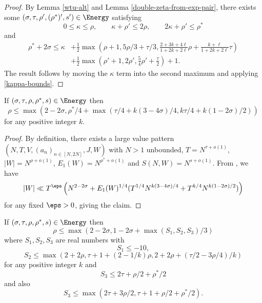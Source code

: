
\begin{proof}
By Lemma \ref{wtu-alt} and Lemma \ref{double-zeta-from-exp-pair}, there exists some $(\sigma, \tau, \rho', (\rho^*)', s') \in \Energy$ satisfying
\begin{equation}\label{kappa-bounds}
0 \le \kappa \le \rho,\qquad \kappa + \rho' \le 2\rho,\qquad 2\kappa + \rho' \le \rho^*
\end{equation}
and
\begin{align*}
\rho^* + 2\sigma \le \kappa &+ \frac{1}{2}\max\left( \rho+1, 5\rho/3 + \tau/3, \frac{2+3k+4\ell}{1+2k+2\ell} \rho + \frac{k+\ell}{1+2k+2\ell} \tau\right)\\
&+ \frac{1}{2}\max\left(\rho' + 1, 2\rho', \frac{5}{4}\rho' + \frac{\tau}{2}\right) + 1.
\end{align*}
The result follows by moving the $\kappa$ term into the second maximum and applying \eqref{kappa-bounds}.
\end{proof}


\begin{lemma}\label{hbt-2} If $(\sigma,\tau,\rho,\rho^*,s) \in \Energy$ then
$$ \rho \leq \max( 2-2\sigma, \rho^*/4 + \max(\tau/4 + k(3-4\sigma)/4, k\tau/4 + k(1-2\sigma)/2))$$
for any positive integer $k$.
\end{lemma}

\literature
{}

\begin{proof} By definition, there exists a large value pattern $(N,T,V,(a_n)_{n \in [N,2N]},J,W)$ with $N>1$ unbounded, $T = N^{\tau+o(1)}$, $|W| = N^{\rho+o(1)}$, $E_1(W) = N^{\rho^*+o(1)}$ and $S(N,W) = N^{s+o(1)}$.   From \cite[Lemma 4]{heathbrown_zero_1979}, we have
$$ |W| \ll T^\eps \left( N^{2-2\sigma} + E_1(W)^{1/4} (T^{1/4} N^{k(3-4\sigma)/4} + T^{k/4} N^{k(1-2\sigma)/2})\right)$$
for any fixed $\eps>0$, giving the claim.
\end{proof}

\begin{lemma}\label{gm-1}  If $(\sigma,\tau,\rho,\rho^*,s) \in \Energy$ then
$$ \rho \leq \max(2-2\sigma, 1-2\sigma + \max(S_1, S_2, S_3)/3)$$
where $S_1, S_2, S_3$ are real numbers with
$$ S_1 \leq -10,$$
$$ S_2 \leq \max(2+2\rho, \tau+1+(2-1/k) \rho, 2 + 2\rho + (\tau/2 - 3\rho/4)/k )$$
for any positive integer $k$ and
$$ S_3 \leq 2\tau + \rho/2 + \rho^*/2$$
and also
$$ S_3 \leq \max( 2\tau + 3\rho/2, \tau+1+\rho/2+\rho^*/2).$$
\end{lemma}

